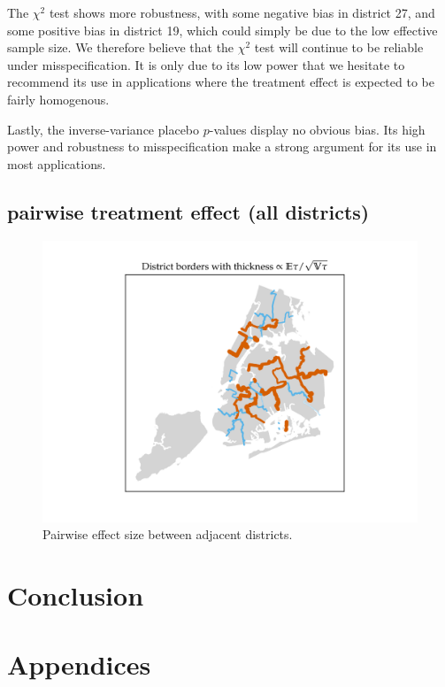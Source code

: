 \documentclass[letter]{article}
\makeatletter
\def\maxwidth{\ifdim\Gin@nat@width>\linewidth\linewidth
\else\Gin@nat@width\fi}
\let\Oldincludegraphics\includegraphics
\renewcommand{\includegraphics}[1]{\Oldincludegraphics[width=.8\maxwidth]{#1}}
\makeatother
\begin{document}
The \(\chi^2\) test shows more robustness, with some negative bias in
district 27, and some positive bias in district 19, which could simply
be due to the low effective sample size. We therefore believe that the
\(\chi^2\) test will continue to be reliable under misspecification. It
is only due to its low power that we hesitate to recommend its use in
applications where the treatment effect is expected to be fairly
homogenous.

Lastly, the inverse-variance placebo \(p\)-values display no obvious
bias. Its high power and robustness to misspecification make a strong
argument for its use in most applications.
    


    	\subsection{pairwise treatment effect (all
districts)}\label{pairwise-treatment-effect-all-districts}

\begin{figure}
\centering
\includegraphics{NYC/NYC_plots/pairwise_multi.png}
\caption{Pairwise effect size between adjacent districts.}
\end{figure}
    


    	\section{Conclusion}\label{conclusion}
    


    	\section{Appendices}\label{appendices}
    
\end{document}
